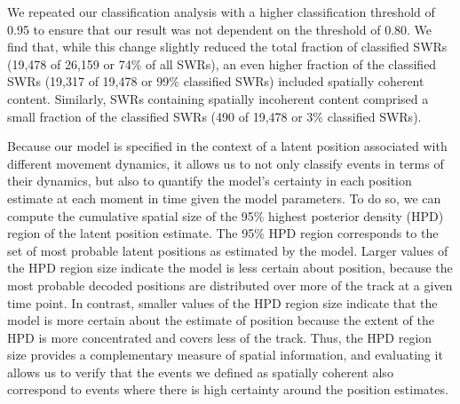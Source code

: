 \documentclass[9pt,lineno]{elife}
\begin{document}
We repeated our classification analysis with a higher classification threshold of 0.95 to ensure that our result was not dependent on the threshold of 0.80. We find that, while this change slightly reduced the total fraction of classified SWRs (19,478 of 26,159 or 74\% of all SWRs), an even higher fraction of the classified SWRs (19,317 of 19,478 or 99\% classified SWRs) included spatially coherent content. Similarly, SWRs containing spatially incoherent content comprised a small fraction of the classified SWRs (490 of 19,478 or 3\% classified SWRs).

Because our model is specified in the context of a latent position associated with different movement dynamics, it allows us to not only classify events in terms of their dynamics, but also to quantify the model's certainty in each position estimate at each moment in time given the model parameters. To do so, we can compute the cumulative spatial size of the 95\% highest posterior density (HPD) region of the latent position estimate. The 95\% HPD region corresponds to the set of most probable latent positions as estimated by the model. Larger values of the HPD region size indicate the model is less certain about position, because the most probable decoded positions are distributed over more of the track at a given time point. In contrast, smaller values of the HPD region size indicate that the model is more certain about the estimate of position because the extent of the HPD is more concentrated and covers less of the track. Thus, the HPD region size provides a complementary measure of spatial information, and evaluating it allows us to verify that the events we defined as spatially coherent also correspond to events where there is high certainty around the position estimates. 
\end{document}
